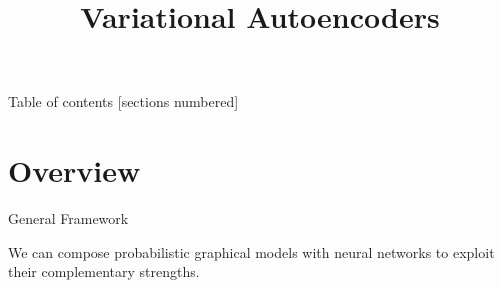 \documentclass[10pt]{beamer}
\title{Variational Autoencoders}
\begin{document}
\maketitle

\begin{frame}{Table of contents}
  [sections numbered]
  \tableofcontents[hideallsubsections]
\end{frame}

\section{Overview}

\begin{frame}{General Framework}

  \begin{minipage}[t][.9\textheight]{\textwidth}
We can compose probabilistic graphical models with neural networks to exploit their complementary strengths. 


\end{minipage}
\end{frame}
\end{document}
